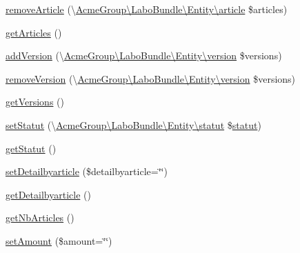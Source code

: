 \begin{DoxyCompactItemize}
\item 
\hyperlink{class_acme_group_1_1_labo_bundle_1_1_entity_1_1facture_a2e5697bf8179acdbf9925dc970653234}{remove\+Article} (\textbackslash{}\hyperlink{class_acme_group_1_1_labo_bundle_1_1_entity_1_1article}{Acme\+Group\textbackslash{}\+Labo\+Bundle\textbackslash{}\+Entity\textbackslash{}article} \$articles)
\item 
\hyperlink{class_acme_group_1_1_labo_bundle_1_1_entity_1_1facture_a5cff8c59678c7fed07d597f94ed3dc5f}{get\+Articles} ()
\item 
\hyperlink{class_acme_group_1_1_labo_bundle_1_1_entity_1_1facture_a3be25761ef8949e74d0e78508b9d8f79}{add\+Version} (\textbackslash{}\hyperlink{class_acme_group_1_1_labo_bundle_1_1_entity_1_1version}{Acme\+Group\textbackslash{}\+Labo\+Bundle\textbackslash{}\+Entity\textbackslash{}version} \$versions)
\item 
\hyperlink{class_acme_group_1_1_labo_bundle_1_1_entity_1_1facture_a38ae0fa944bc77c0b84019c4bffc54a3}{remove\+Version} (\textbackslash{}\hyperlink{class_acme_group_1_1_labo_bundle_1_1_entity_1_1version}{Acme\+Group\textbackslash{}\+Labo\+Bundle\textbackslash{}\+Entity\textbackslash{}version} \$versions)
\item 
\hyperlink{class_acme_group_1_1_labo_bundle_1_1_entity_1_1facture_a8dd0a5262aa52fdeefa6b74f688cb961}{get\+Versions} ()
\item 
\hyperlink{class_acme_group_1_1_labo_bundle_1_1_entity_1_1facture_aa23fa78ef4129cde2608fc79c9eafcb1}{set\+Statut} (\textbackslash{}\hyperlink{class_acme_group_1_1_labo_bundle_1_1_entity_1_1statut}{Acme\+Group\textbackslash{}\+Labo\+Bundle\textbackslash{}\+Entity\textbackslash{}statut} \$\hyperlink{class_acme_group_1_1_labo_bundle_1_1_entity_1_1statut}{statut})
\item 
\hyperlink{class_acme_group_1_1_labo_bundle_1_1_entity_1_1facture_a67943ba5ff77a4968ec85427e16429b9}{get\+Statut} ()
\item 
\hyperlink{class_acme_group_1_1_labo_bundle_1_1_entity_1_1facture_ada3db2962d69e7297147835799e644db}{set\+Detailbyarticle} (\$detailbyarticle=\char`\"{}\char`\"{})
\item 
\hyperlink{class_acme_group_1_1_labo_bundle_1_1_entity_1_1facture_ae9ea2eecc5cc08308b70cc2edb734741}{get\+Detailbyarticle} ()
\item 
\hyperlink{class_acme_group_1_1_labo_bundle_1_1_entity_1_1facture_aef9bd22d8b643ae3833081cf70f99fd7}{get\+Nb\+Articles} ()
\item 
\hyperlink{class_acme_group_1_1_labo_bundle_1_1_entity_1_1facture_a8ef16cd5b10296235132281f1ab90186}{set\+Amount} (\$amount=\char`\"{}\char`\"{})

\end{DoxyCompactItemize}
